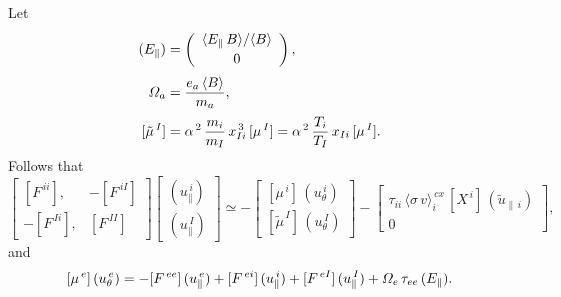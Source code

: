 \documentclass[12pt]{article}
\begin{document}
Let
\begin{align}
(E_\parallel) &=\left(\begin{array}{c}\langle E_\parallel\,B\rangle/\langle B\rangle\\[0.5ex]
0\end{array}\right),\\[0.5ex]
{\mit\Omega}_a &= \frac{e_a\,\langle B\rangle}{m_a},\\[0.5ex]
[\tilde{\mu}^{\,I}] &= \alpha^{\,2}\,\frac{m_i}{m_I}\,x_{Ii}^{\,3}\,[\mu^{\,I}]=\alpha^{\,2}\,\frac{T_i}{T_I}\,x_{Ii}\,[\mu^{\,I}].
\end{align}
Follows that
\begin{equation}
\left[\begin{array}{rr} [F^{\,ii}], & -[F^{\,iI}]\\[0.5ex] -[F^{\,Ii}], & [F^{\,II}]\end{array}\right]
\left[\begin{array}{c}(u_\parallel^{\,i}) \\[0.5ex] (u_\parallel^{\,I})\end{array}\right]
\simeq -\left[\begin{array}{c} [\mu^{\,i}]\,(u_\theta^{\,i}) \\[0.5ex]
[\tilde{\mu}^{\,I}]\,(u_\theta^{\,I})\end{array}\right]-\left[\begin{array}{c}{\tau_{ii}\,\langle\sigma\,v\rangle_i^{\,cx}\,[X^{\,i}]\,(\tilde{u}_{\parallel\,i})}\\[0.5ex] 0\end{array}\right],
\end{equation}
and
\begin{equation}\label{e173}
[\mu^{\,e}]\,(u_\theta^{\,e})= -[F^{\,ee}]\,(u_\parallel^{\,e})+[F^{\,ei}]\,(u_\parallel^{\,i})+[F^{\,eI}]\,(u_\parallel^{\,I})+{\mit\Omega}_e\,\tau_{ee}\,(E_\parallel).
\end{equation}
\end{document}
